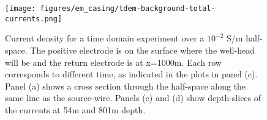 \begin{figure}
    \begin{center}
    \texttt{[image: figures/em\_casing/tdem-background-total-currents.png]}
    \end{center}
\caption{
    Current density for a time domain experiment over a $10^{-2}$ S/m half-space.
    The positive electrode is on the surface where the well-head will be and the return electrode is at x=1000m. Each row corresponds to different time, as indicated in the plots in panel (c). Panel (a) shows a cross section through the half-space along the same line as the source-wire. Panels (c) and (d) show depth-slices of the currents at 54m and 801m depth.
}
\label{fig:tdem-background-total-currents}
\end{figure}



